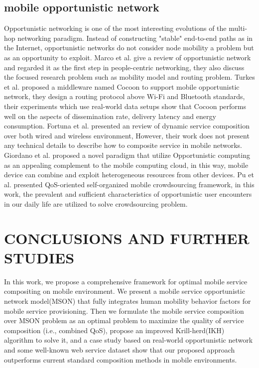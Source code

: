 \documentclass[10pt,journal,compsoc]{IEEEtran}
\begin{document}
\subsection{mobile opportunistic network}
Opportunistic networking is one of the most interesting evolutions of the multi-hop networking paradigm. Instead of constructing "stable" end-to-end paths as in the Internet, opportunistic networks do not consider node mobility a problem but as an opportunity to exploit. 
Marco et al. \cite{Conti2014} give a review of opportunistic network and regarded it as the first step in people-centric networking, they also discuss the focused research problem such as mobility model and routing problem.
Turkes et al. \cite{turkes2016cocoon} proposed a middleware named Cocoon to support mobile opportunistic network, they design a routing protocol above Wi-Fi and Bluetooth standards, their experiments which use real-world data setups show that Cocoon performs well on the aspects of dissemination rate, delivery latency and energy consumption.
Fortuna et al. \cite{fortuna2009dynamic} presented an review of dynamic service composition over both wired and wireless environment, However, their work does not present any technical details to describe how to composite service in mobile networks.
Giordano et al. \cite{Giordano2011} proposed a novel paradigm that utilize Opportunistic computing as an appealing complement to the mobile computing cloud, in this way, mobile device can combine and exploit heterogeneous resources from other devices.
Pu et al. \cite{Pu2017} presented QoS-oriented self-organized mobile crowdsourcing framework, in this work, the prevalent and sufficient characteristics of opportunistic user encounters in our daily life are utilized to solve crowdsourcing problem.
\section{CONCLUSIONS AND FURTHER STUDIES}
In this work, we propose a comprehensive framework for optimal mobile service compositing on mobile environment. We present a mobile service opportunistic network model(MSON) that fully integrates human mobility behavior factors for mobile service provisioning. Then we formulate the mobile service composition over MSON problem as an optimal problem to maximize the quality of service composition (i.e., combined QoS), propose an improved Krill-herd(IKH) algorithm to solve it, and a case study based on real-world opportunistic network and some well-known web service dataset show that our proposed approach outperforms current standard composition methods in mobile environments.
\end{document}
